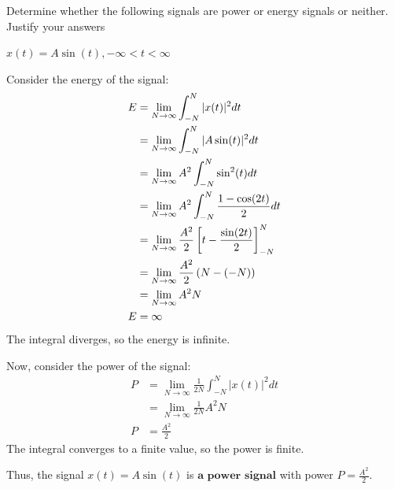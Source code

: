 \documentclass[a4paper, 10pt]{article}
\begin{document}
\begin{problem}
Determine whether the following signals are power or energy signals or neither. Justify your answers
\end{problem}

\begin{subproblems}
    \item \( x(t) = A\sin( t ), -\infty < t < \infty \)
\end{subproblems}

\begin{solution}
Consider the energy of the signal:
\begin{align*}
    E &= \lim_{N \to \infty} \int_{-N}^{N} |x(t)|^2 dt \\
    &= \lim_{N \to \infty} \int_{-N}^{N} |A\sin(t)|^2 dt \\
    &= \lim_{N \to \infty} A^2 \int_{-N}^{N} \sin^2(t) dt \\
    &= \lim_{N \to \infty} A^2 \int_{-N}^{N} \frac{1 - \cos(2t)}{2} dt \\
    &= \lim_{N \to \infty} \frac{A^2}{2} \left[ t - \frac{\sin(2t)}{2} \right]_{-N}^{N} \\
    &= \lim_{N \to \infty} \frac{A^2}{2} \left( N - (-N) \right) \\
    &= \lim_{N \to \infty} A^2 N \\
    E &= \infty
\end{align*}
The integral diverges, so the energy is infinite.

\vspace{5mm}

Now, consider the power of the signal:
\begin{align*}
    P &= \lim_{N \to \infty} \frac{1}{2N} \int_{-N}^{N} |x(t)|^2 dt \\
    &= \lim_{N \to \infty} \frac{1}{2N} A^2 N \\
    P &= \frac{A^2}{2}
\end{align*}
The integral converges to a finite value, so the power is finite.

\vspace{2mm}

Thus, the signal \( x(t) = A\sin( t ) \) is \( \boxed{\textbf{a power signal}} \) with power \( \boxed{P = \frac{A^2}{2}} \).


\end{solution}
\end{document}
